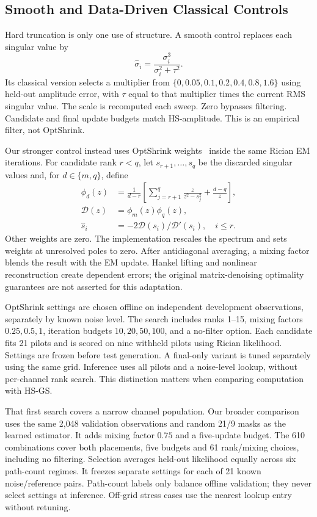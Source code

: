 \documentclass[10pt,journal,letterpaper]{IEEEtran}
\begin{document}
\subsection{Smooth and Data-Driven Classical Controls}
Hard truncation is only one use of structure. A smooth control replaces each singular value by
\begin{equation}
 \widehat\sigma_i=\frac{\sigma_i^3}{\sigma_i^2+\tau^2}.
 \label{eq:shrink}
\end{equation}
Its classical version selects a multiplier from $\{0,0.05,0.1,0.2,0.4,0.8,1.6\}$ using held-out amplitude error, with $\tau$ equal to that multiplier times the current RMS singular value. The scale is recomputed each sweep. Zero bypasses filtering. Candidate and final update budgets match HS-amplitude. This is an empirical filter, not OptShrink.

Our stronger control instead uses OptShrink weights~\cite{nadakuditi2014} inside the same Rician EM iterations. For candidate rank $r<q$, let $s_{r+1},\ldots,s_q$ be the discarded singular values and, for $d\in\{m,q\}$, define
\begin{align}
 \phi_d(z)&=\frac{1}{d-r}\left[\sum_{j=r+1}^{q}\frac{z}{z^2-s_j^2}+\frac{d-q}{z}\right],\\
 \mathcal D(z)&=\phi_m(z)\phi_q(z),\nonumber\\
 \widehat s_i&=-2\mathcal D(s_i)/\mathcal D'(s_i),\quad i\le r.
\end{align}
Other weights are zero. The implementation rescales the spectrum and sets weights at unresolved poles to zero. After antidiagonal averaging, a mixing factor blends the result with the EM update. Hankel lifting and nonlinear reconstruction create dependent errors; the original matrix-denoising optimality guarantees are not asserted for this adaptation.

OptShrink settings are chosen offline on independent development observations, separately by known noise level. The search includes ranks 1--15, mixing factors $0.25,0.5,1$, iteration budgets $10,20,50,100$, and a no-filter option. Each candidate fits 21 pilots and is scored on nine withheld pilots using Rician likelihood. Settings are frozen before test generation. A final-only variant is tuned separately using the same grid. Inference uses all pilots and a noise-level lookup, without per-channel rank search. This distinction matters when comparing computation with HS-GS.

That first search covers a narrow channel population. Our broader comparison uses the same 2,048 validation observations and random 21/9 masks as the learned estimator. It adds mixing factor $0.75$ and a five-update budget. The 610 combinations cover both placements, five budgets and 61 rank/mixing choices, including no filtering. Selection averages held-out likelihood equally across six path-count regimes. It freezes separate settings for each of 21 known noise/reference pairs. Path-count labels only balance offline validation; they never select settings at inference. Off-grid stress cases use the nearest lookup entry without retuning.
\end{document}
